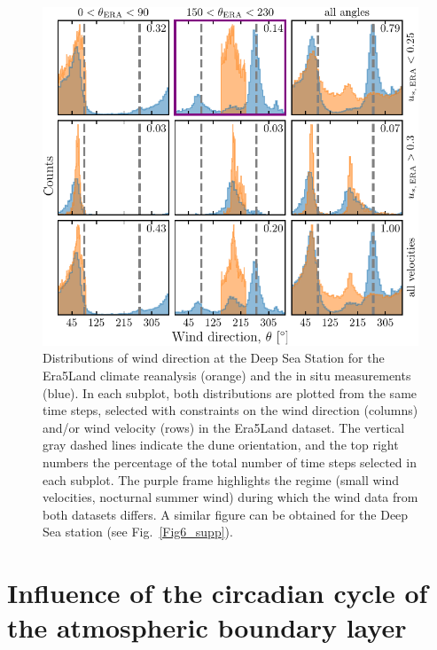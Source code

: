   \begin{figure}
    \centering
    \includegraphics[scale=1]{Figures/Figure3.pdf}
    \caption{Distributions of wind direction at the Deep Sea Station for the Era5Land climate reanalysis (orange) and the in situ measurements (blue). In each subplot, both distributions are plotted from the same time steps, selected with constraints on the wind direction (columns) and/or wind velocity (rows) in the Era5Land dataset. The vertical gray dashed lines indicate the dune orientation, and the top right numbers the percentage of the total number of time steps selected in each subplot. The purple frame highlights the regime (small wind velocities, nocturnal summer wind) during which the wind data from both datasets differs. A similar figure can be obtained for the Deep Sea station (see Fig.~\ref{Fig6_supp}).}
    \label{Fig3}
  \end{figure}


  \section{Influence of the circadian cycle of the atmospheric boundary layer}

